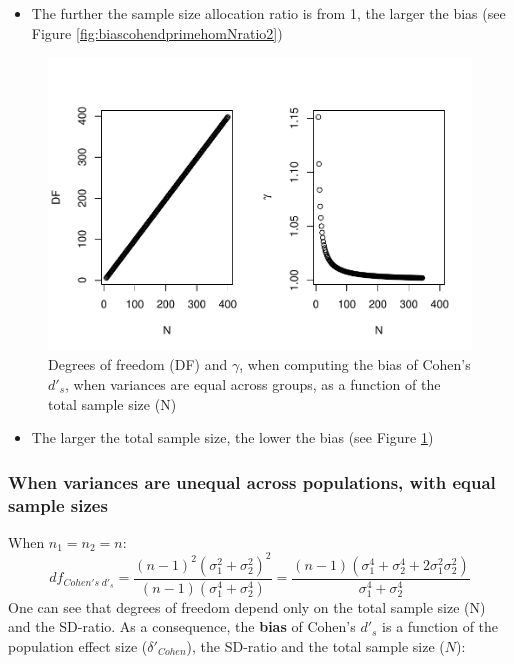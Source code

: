 \documentclass[
  man]{apa6}
\providecommand{\tightlist}{%
  \setlength{\itemsep}{0pt}\setlength{\parskip}{0pt}}
\begin{document}
\begin{itemize}
\tightlist
\item
  The further the sample size allocation ratio is from 1, the larger the bias (see Figure \ref{fig:biascohendprimehomNratio2})
\end{itemize}

\begin{figure}
\centering
\includegraphics{Theoretical-Bias-of-all-estimators-as-a-function-of-population-parameters_files/figure-latex/biascohendprimehomNsize2-1.pdf}
\caption{\label{fig:biascohendprimehomNsize2}Degrees of freedom (DF) and \(\gamma\), when computing the bias of Cohen's \(d'_s\), when variances are equal across groups, as a function of the total sample size (N)}
\end{figure}

\begin{itemize}
\tightlist
\item
  The larger the total sample size, the lower the bias (see Figure \ref{fig:biascohendprimehomNsize2})
\end{itemize}

\hypertarget{when-variances-are-unequal-across-populations-with-equal-sample-sizes}{%
\subsubsection{When variances are unequal across populations, with equal sample sizes}\label{when-variances-are-unequal-across-populations-with-equal-sample-sizes}}

When \(n_1=n_2=n\):
\[df_{Cohen's \; d'_s} = \frac{(n-1)^2(\sigma^2_1+\sigma^2_2)^2}{(n-1)(\sigma^4_1+\sigma^4_2)} =  \frac{(n-1)(\sigma^4_1+\sigma^4_2+2\sigma^2_1\sigma^2_2)}{\sigma^4_1+\sigma^4_2}\]
One can see that degrees of freedom depend only on the total sample size (N) and the SD-ratio. As a consequence, the \textbf{bias} of Cohen's \(d'_s\) is a function of the population effect size (\(\delta'_{Cohen}\)), the SD-ratio and the total sample size (\(N\)):
\end{document}
